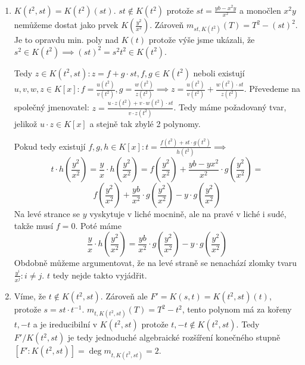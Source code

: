 \documentclass[12pt, a4paper]{article}
\begin{document}
\begin{enumerate}[label=(\alph*)]
    \item $K(t^2,st)=K(t^2)(st)$. $st \notin K(t^2)$ protože $st=\frac{yb-x^2y}{x^2}$ a monočlen $x^2y$ nemůžeme dostat jako prvek $K(\frac{y^2}{x^2})$. Zároveň $m_{st,K(t^2)}(T) = T^2-(st)^2$. Je to opravdu min. poly nad $K(t)$ protože výše jsme ukázali, že $s^2 \in K(t^2)\implies (st)^2=s^2t^2 \in K(t^2)$.

    Tedy $z \in K(t^2,st): z = f+g\cdot st, f,g \in K(t^2)$ neboli existují $u,v,w,z \in K[x]: f = \frac{u(t^2)}{v(t^2)}, g = \frac{w(t^2)}{z(t^2)} \implies z = \frac{u(t^2)}{v(t^2)} + \frac{w(t^2)\cdot st}{z(t^2)}$. Převedeme na společný jmenovatel: $z = \frac{u\cdot z(t^2) + v\cdot w(t^2)\cdot st}{v\cdot z (t^2)}$. Tedy máme požadovaný tvar, jelikož $u\cdot z \in K[x]$ a stejně tak zbylé 2 polynomy. 

    Pokud tedy existují $f,g,h \in K[x]: t = \frac{f(t^2)+st\cdot g(t^2)}{h(t^2)} \implies$
    \[t \cdot h\left(\frac{y^2}{x^2}\right)=\frac{y}{x} \cdot h\left(\frac{y^2}{x^2}\right) = f\left(\frac{y^2}{x^2}\right)+\frac{yb-yx^2}{x^2} \cdot g\left(\frac{y^2}{x^2}\right) =\]
    \[f\left(\frac{y^2}{x^2}\right)+\frac{yb}{x^2} \cdot g\left(\frac{y^2}{x^2}\right) - y\cdot g\left(\frac{y^2}{x^2}\right)\]
    Na levé strance se $y$ vyskytuje v liché mocnině, ale na pravé v liché i sudé, takže musí $f = 0$. Poté máme
    \[
    \frac{y}{x} \cdot h\left(\frac{y^2}{x^2}\right)=\frac{yb}{x^2} \cdot g\left(\frac{y^2}{x^2}\right) - y\cdot g\left(\frac{y^2}{x^2}\right)
    \]
    Obdobně můžeme argumentovat, že na levé straně se nenachází zlomky tvaru $\frac{y^i}{x^{j}}: i \neq j$. $t$ tedy nejde takto vyjádřit.

    \item Víme, že $t \notin K(t^2,st)$. Zároveň ale $F'=K(s,t)=K(t^2,st)(t)$, protože $s=st\cdot t^{-1}$. $m_{t,K(t^2,st)}(T)=T^2-t^2$, tento polynom má za kořeny $t,-t$ a je ireducibilní v $K(t^2,st)$ protože $t,-t \notin K(t^2,st)$. Tedy $F'/K(t^2,st)$ je tedy jednoduché algebraické rozšíření konečného stupně $[F':K(t^2,st)]=\deg m_{t,K(t^2,st)} = 2$.
\end{enumerate}
\end{document}
